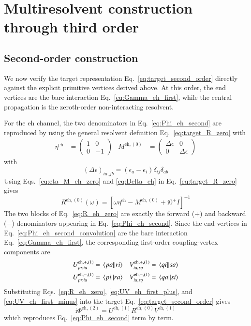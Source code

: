 \documentclass[aip,jcp,reprint,noshowkeys,superscriptaddress]{revtex4-1}
\newcommand{\eps}{\epsilon}
\newcommand{\ii}{\mathrm{i}}
\newcommand{\eh}{\text{eh}}
\begin{document}
\section{Multiresolvent construction through third order}
\label{sec:second_order_multiresolvent}

\subsection{Second-order construction}

We now verify the target representation
Eq.~\eqref{eq:target_second_order} directly against the explicit primitive
vertices derived above.
At this order, the end vertices are the bare interaction
Eq.~\eqref{eq:Gamma_eh_first}, while the central propagation is the
zeroth-order non-interacting resolvent.

For the $\eh$ channel, the two denominators in
Eq.~\eqref{eq:Phi_eh_second} are reproduced by using the general resolvent
definition Eq.~\eqref{eq:target_R_zero} with
\begin{align}
	\eta^\eh
	&=
	\begin{pmatrix}
	1&0
	\\
	0&-1
	\end{pmatrix}
	&
	M^{\eh,(0)}
	&=
	\begin{pmatrix}
	\Delta\eps&0
	\\
	0&\Delta\eps
	\end{pmatrix}
	\label{eq:eta_M_eh_zero}
\end{align}
with
\begin{equation}
	(\Delta\eps)_{ia,jb}
	=
	(\eps_a-\eps_i)\delta_{ij}\delta_{ab}
	\label{eq:Delta_eh}
\end{equation}
Using Eqs.~\eqref{eq:eta_M_eh_zero} and \eqref{eq:Delta_eh} in
Eq.~\eqref{eq:target_R_zero} gives
\begin{equation}
	R^{\eh,(0)}(\omega)
	=
	\left[
	\omega\eta^\eh-M^{\eh,(0)}+\ii0^+I
	\right]^{-1}
	\label{eq:R_eh_zero}
\end{equation}
The two blocks of Eq.~\eqref{eq:R_eh_zero} are exactly the forward ($+$)
and backward ($-$) denominators appearing in
Eq.~\eqref{eq:Phi_eh_second}.
Since the end vertices in Eq.~\eqref{eq:Phi_eh_second_convolution} are the
bare interaction Eq.~\eqref{eq:Gamma_eh_first}, the corresponding
first-order coupling-vertex components are
\begin{align}
	U^{\eh,+,(1)}_{pr,ia}
	&=
	\mel{pa}{}{ri}
	&
	V^{\eh,+,(1)}_{ia,sq}
	&=
	\mel{qi}{}{sa}
	\label{eq:UV_eh_first_plus}
	\\
	U^{\eh,-,(1)}_{pr,ia}
	&=
	\mel{pi}{}{ra}
	&
	V^{\eh,-,(1)}_{ia,sq}
	&=
	\mel{qa}{}{si}
	\label{eq:UV_eh_first_minus}
\end{align}
Substituting Eqs.~\eqref{eq:R_eh_zero},
\eqref{eq:UV_eh_first_plus}, and \eqref{eq:UV_eh_first_minus} into the
target Eq.~\eqref{eq:target_second_order} gives
\begin{equation}
	\ii\Phi^{\eh,(2)}
	=
	U^{\eh,(1)}R^{\eh,(0)}V^{\eh,(1)}
	\label{eq:Phi_eh_second_resolvent}
\end{equation}
which reproduces Eq.~\eqref{eq:Phi_eh_second} term by term.
\end{document}
